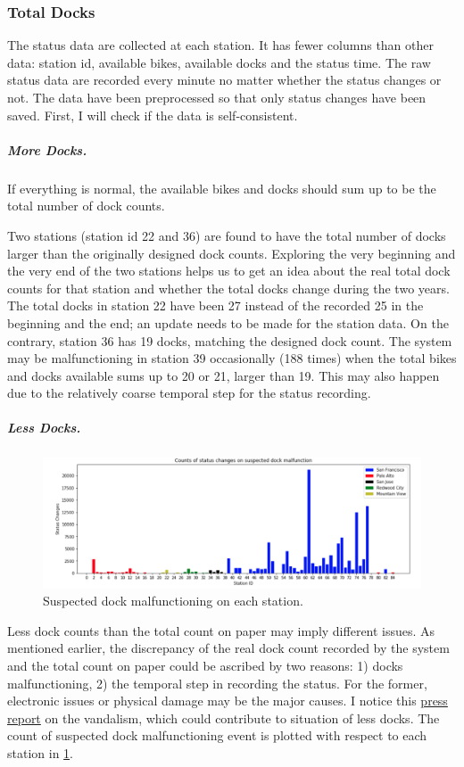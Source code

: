 \documentclass[a4paper]{article}
\begin{document}
			\subsubsection{Total Docks}
			The status data are collected at each station. It has fewer columns than other data: station id, available bikes, available docks and the status time. The raw status data are recorded every minute no matter whether the status changes or not. The data have been preprocessed so that only status changes have been saved. First, I will check if the data is self-consistent.
				\subparagraph{More Docks.}
				If everything is normal, the available bikes and docks should sum up to be the total number of dock counts. 
				
				Two stations (station id 22 and 36) are found to have the total number of docks larger than the originally designed dock counts. Exploring the very beginning and the very end of the two stations helps us to get an idea about the real total dock counts for that station and whether the total docks change during the two years. The total docks in station 22 have been 27 instead of the recorded 25 in the beginning and the end; an update needs to be made for the station data. On the contrary, station 36 has 19 docks, matching the designed dock count. The system may be malfunctioning in station 39 occasionally (188 times) when the total bikes and docks available sums up to 20 or 21, larger than 19. This may also happen due to the relatively coarse temporal step for the status recording.
				
				\subparagraph{Less Docks.}
				
				\begin{figure}
					\centering
					\includegraphics[width=1\textwidth]{LessDocks.png}
					\caption{\label{fig:malfunction}Suspected dock malfunctioning on each station.}
				\end{figure}						
				
				Less dock counts than the total count on paper may imply different issues. As mentioned earlier, the discrepancy of the real dock count recorded by the system and the total count on paper could be ascribed by two reasons: 1) docks malfunctioning, 2) the temporal step in recording the status. For the former, electronic issues or physical damage may be the major causes. I notice this \href{https://www.theguardian.com/us-news/2017/aug/21/bike-sharing-scheme-san-francisco-gentrification-vandalism}{press report} on the vandalism, which could contribute to situation of less docks. The count of suspected dock malfunctioning event is plotted with respect to each station in \ref{fig:malfunction}.
				
\end{document}
